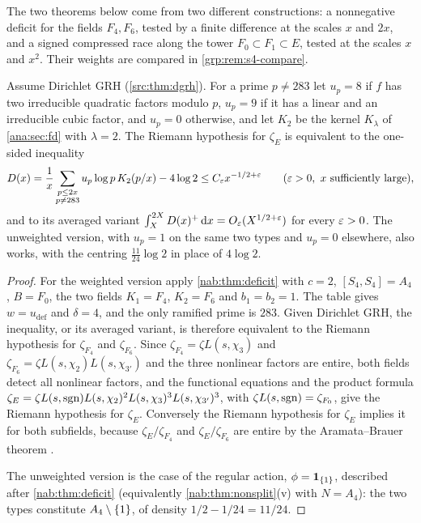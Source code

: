 The two theorems below come from two different constructions: a nonnegative
deficit for the fields $F_4,F_6$, tested by a finite difference at the scales
$x$ and $2x$, and a signed compressed race along the tower
$F_0\subset F_1\subset E$, tested at the scales $x$ and $x^2$. Their weights
are compared in \cref{grp:rem:s4-compare}.

\begin{theorem}\label{grp:thm:s4}
Assume Dirichlet GRH (\cref{src:thm:dgrh}). For a prime $p\ne283$ let
$u_p=8$ if $f$ has two irreducible quadratic factors modulo $p$, $u_p=9$ if it
has a linear and an irreducible cubic factor, and $u_p=0$ otherwise, and let
$K_2$ be the kernel $K_\lambda$ of \cref{ana:sec:fd} with $\lambda=2$. The Riemann
hypothesis for $\zeta_E$ is equivalent to the one-sided inequality
\[
 D(x)=\frac1x\sum_{\substack{p\le2x\\p\ne283}}u_p\log p\,K_2(p/x)-4\log2
 \le C_\varepsilon x^{-1/2+\varepsilon}\qquad(\varepsilon>0,\ x\text{ sufficiently large}),
\]
and to its averaged variant
$\int_X^{2X}D(x)^{+}\,\mathrm{d} x=O_\varepsilon(X^{1/2+\varepsilon})$ for every $\varepsilon>0$. The
unweighted version, with $u_p=1$ on the same two types and $u_p=0$ elsewhere,
also works, with the centring $\tfrac{11}{24}\log2$ in place of $4\log2$.
\end{theorem}

\begin{proof}
For the weighted version apply \cref{nab:thm:deficit} with $c=2$,
$[S_4,S_4]=A_4$, $B=F_0$, the two fields $K_1=F_4$, $K_2=F_6$ and $b_1=b_2=1$.
The table gives $w=u_{\mathrm{def}}$ and $\delta=4$, and the only ramified
prime is $283$. Given Dirichlet GRH, the inequality, or its averaged
variant, is therefore equivalent to the Riemann hypothesis for $\zeta_{F_4}$
and $\zeta_{F_6}$. Since $\zeta_{F_4}=\zeta L(s,\chi_3)$ and
$\zeta_{F_6}=\zeta L(s,\chi_2)L(s,\chi_{3'})$ and the three nonlinear factors
are entire, both fields detect all nonlinear factors, and the functional
equations and the product formula
$\zeta_E=\zeta L(s,\operatorname{sgn})L(s,\chi_2)^2L(s,\chi_3)^3L(s,\chi_{3'})^3$, with
$\zeta L(s,\operatorname{sgn})=\zeta_{F_0}$, give the Riemann hypothesis for $\zeta_E$.
Conversely the Riemann hypothesis for $\zeta_E$ implies it for both subfields,
because $\zeta_E/\zeta_{F_4}$ and $\zeta_E/\zeta_{F_6}$ are entire by the
Aramata--Brauer theorem \cite{Brauer1947Zeta,MurtyMurty1997Nonvanishing}.

The unweighted version is the case of the regular action,
$\phi=\mathbf{1}_{\{1\}}$, described after \cref{nab:thm:deficit} (equivalently
\cref{nab:thm:nonsplit}\textup{(v)} with $N=A_4$): the two types constitute
$A_4\setminus\{1\}$, of density $1/2-1/24=11/24$.
\end{proof}

